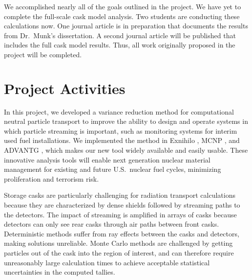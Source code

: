 \documentclass[12pt]{article}
\begin{document}
We accomplished nearly all of the goals outlined in the project. We have yet to complete the full-scale cask model analysis. Two students are conducting these calculations now. One journal article is in preparation that documents the results from Dr.\ Munk's dissertation. A second journal article will be published that includes the full cask model results. Thus, all work originally proposed in the project will be completed.



%
\section{Project Activities}
\label{sect::project}

In this project, we developed a variance reduction method for computational neutral particle transport to improve the ability to design and operate systems in which particle streaming is important, such as monitoring systems for interim used fuel installations. 
We implemented the method in Exnihilo \cite{evans_denovo:_2010}, MCNP \cite{brown_mcnp_2002}, and ADVANTG \cite{mosher_new_2010}, which makes our new tool widely available and easily usable. 
These innovative analysis tools will enable next generation nuclear material management for existing and future U.S.\ nuclear fuel cycles, minimizing proliferation and terrorism risk.

Storage casks are particularly challenging for radiation transport calculations because they are characterized by dense shields followed by streaming paths to the detectors. 
The impact of streaming is amplified in arrays of casks because detectors can only see rear casks through air paths between front casks. 
Deterministic methods suffer from ray effects between the casks and detectors, making solutions unreliable. 
Monte Carlo methods are challenged by getting particles out of the cask into the region of interest, and can therefore require unreasonably large calculation times to achieve acceptable statistical uncertainties in the computed tallies.
\end{document}
